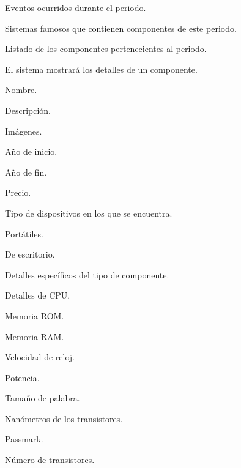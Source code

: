 \begin{myEnumRFM}
\begin{myEnumRFM}
		\item Eventos ocurridos durante el periodo.
		\item Sistemas famosos que contienen componentes de este periodo.
		\item Listado de los componentes pertenecientes al periodo.
	\end{myEnumRFM}
	\item\label{it:detalles_comp} El sistema mostrará los detalles de un componente.
	\begin{myEnumRFM}
		\item Nombre.
		\item Descripción.
		\item Imágenes.
		\item Año de inicio.
		\item Año de fin.
		\item Precio.
		\item Tipo de dispositivos en los que se encuentra.
		\begin{myEnumRFM}
			\item Portátiles.
			\item De escritorio.
		\end{myEnumRFM}
		\item Detalles específicos del tipo de componente.
		\begin{myEnumRFM}
			\item Detalles de CPU.
			\begin{myEnumRFM}
				\item Memoria ROM.
				\item Memoria RAM.
				\item Velocidad de reloj.
				\item Potencia.
				\item Tamaño de palabra.
				\item Nanómetros de los transistores.
				\item Passmark.
				\item Número de transistores.
			\end{myEnumRFM}
		\end{myEnumRFM}
	\end{myEnumRFM}
\end{myEnumRFM}

